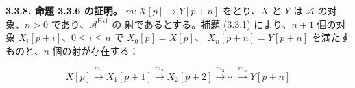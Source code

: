 \medskip\noindent\textbf{3.3.8. 命題 3.3.6 の証明。}\quad
$m\colon X[p]\longrightarrow Y[p+n]$ をとり、$X$ と $Y$ は
$\mathcal A$ の対象、$n>0$ であり、$\mathcal A^{\operatorname{Ext}}$ の
射であるとする。補題 (3.3.1) により、$n+1$ 個の対象
$X_i[p+i]$、$0\leq i\leq n$ で $X_0[p]=X[p]$、
$X_n[p+n]=Y[p+n]$ を満たすものと、$n$ 個の射が存在する：

\[
X[p]\xrightarrow{m_1}X_1[p+1]\xrightarrow{m_2}X_2[p+2]
\xrightarrow{m_3}\cdots\xrightarrow{m_n}Y[p+n]
\]
\endgroup
